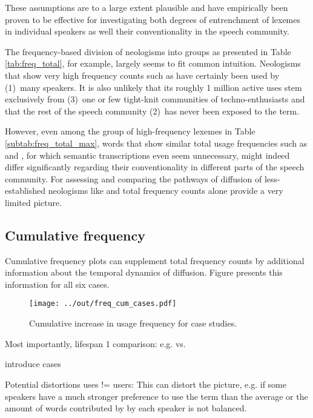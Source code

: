 \documentclass[draft, a4paper, abstract=on]{scrartcl}
\begin{document}
  These assumptions are to a large extent plausible and have empirically been proven to be effective for investigating both degrees of entrenchment of lexemes in individual speakers as well their conventionality in the speech community.

  The frequency-based division of neologisms into groups as presented in Table \ref{tab:freq_total}, for example, largely seems to fit common intuition. Neologisms that show very high frequency counts such as  have certainly been used by (1)~many speakers. It is also unlikely that its roughly 1 million active uses stem exclusively from (3)~one or few tight-knit communities of techno-enthusiasts and that the rest of the speech community (2)~has never been exposed to the term.

  However, even among the group of high-frequency lexemes in Table \ref{subtab:freq_total_max}, words that show similar total usage frequencies such as  and , for which semantic transcriptions even seem unnecessary, might indeed differ significantly regarding their conventionality in different parts of the speech community. For assessing and comparing the pathways of diffusion of less-established neologisms like  and  total frequency counts alone provide a very limited picture.

    \subsection{Cumulative frequency}

  Cumulative frequency plots can supplement total frequency counts by additional information about the temporal dynamics of diffusion. Figure presents this information for all six cases.

  \begin{figure}
  \caption{Cumulative increase in usage frequency for case studies.\protect\footnotemark}
  \label{fig:freq_cum_cases}
  \texttt{[image: ../out/freq\_cum\_cases.pdf]}
  \centering
  \end{figure}

  Most importantly,
  lifespan
  1 comparison: e.g.  vs. 

  introduce cases


  Potential distortions
  uses != users: This can distort the picture, e.g. if some speakers have a much stronger preference to use the term than the average or the amount of words contributed by by each speaker is not balanced.
\end{document}
